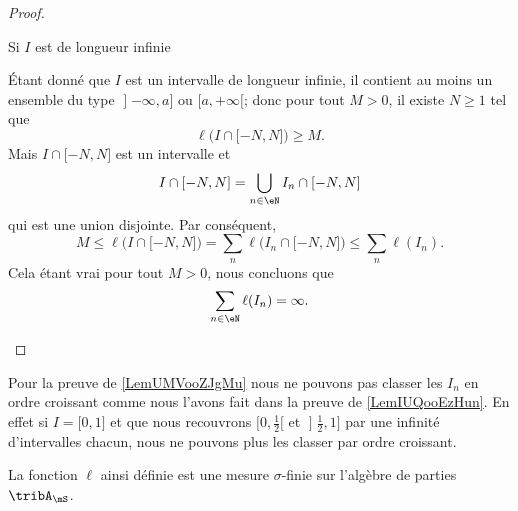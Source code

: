 \begin{proof}
\begin{subproof}
        \item[Si \( I\) est de longueur infinie]

        Étant donné que \( I\) est un intervalle de longueur infinie, il contient au moins un ensemble du type \( \mathopen] -\infty , a \mathclose]\) ou \( \mathopen[ a , +\infty [\); donc  pour tout \( M>0\), il existe \( N\geq 1\) tel que
            \begin{equation}
                \ell\big( I\cap\mathopen[ -N , N \mathclose] \big)\geq M.
            \end{equation}
            Mais \( I\cap\mathopen[ -N , N \mathclose]\) est un intervalle et 
            \begin{equation}
                I\cap\mathopen[ -N , N \mathclose]=\bigcup_{n\in \eN}I_n\cap\mathopen[ -N , N \mathclose]
            \end{equation}
            qui est une union disjointe. Par conséquent,
            \begin{equation}
                M\leq \ell\big( I\cap\mathopen[ -N , N \mathclose] \big)=\sum_n\ell\big( I_n\cap\mathopen[ -N , N \mathclose] \big)\leq\sum_n\ell(I_n).
            \end{equation}
            Cela étant vrai pour tout \( M>0\), nous concluons que
            \begin{equation}
                \sum_{n\in \eN}\ell(I_n)=\infty.
            \end{equation}
    \end{subproof}
\end{proof}

\begin{remark}
    Pour la preuve de \ref{LemUMVooZJgMu} nous ne pouvons pas classer les \( I_n\) en ordre croissant comme nous l'avons fait dans la preuve de \ref{LemIUQooEzHun}. En effet si \( I=\mathopen[ 0 , 1 \mathclose]\) et que nous recouvrons \( \mathopen[ 0 , \frac{ 1 }{2} [\) et \( \mathopen] \frac{ 1 }{2} , 1 \mathclose]\) par une infinité d'intervalles chacun, nous ne pouvons plus les classer par ordre croissant.
\end{remark}

\begin{proposition}     \label{PropULFoodgXrR}
    La fonction \( \ell\) ainsi définie est une mesure \( \sigma\)-finie sur l'algèbre de parties \( \tribA_{\mS}\).
\end{proposition}

